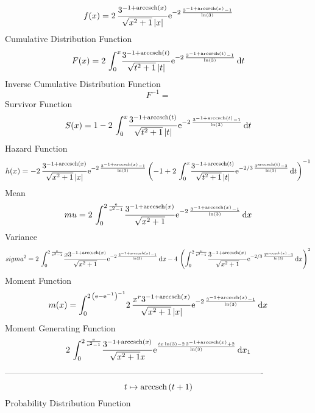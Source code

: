 \documentclass[12pt]{article}
\begin{document}
$$  f(x)=2\,{\frac {{3}^{-1+{\rm arccsch} \left(x\right)}}{\sqrt {{x}^{2}+1}
 \left| x \right| }{{\rm e}^{-2\,{\frac {{3}^{-1+{\rm arccsch} \left(x
\right)}-1}{\ln  \left( 3 \right) }}}}}
$$Cumulative Distribution Function  
 $$F(x)=2\,\int_{0}^{x}\!{\frac {{3}^{-1+{\rm arccsch} \left(t\right)}}{\sqrt 
{{t}^{2}+1} \left| t \right| }{{\rm e}^{-2\,{\frac {{3}^{-1+
{\rm arccsch} \left(t\right)}-1}{\ln  \left( 3 \right) }}}}}\,{\rm d}t
$$ Inverse Cumulative Distribution Function 
  $$F^{-1} = $$Survivor Function 
 $$ S(x)=1-2\,\int_{0}^{x}\!{\frac {{3}^{-1+{\rm arccsch} \left(t\right)}}{
\sqrt {{t}^{2}+1} \left| t \right| }{{\rm e}^{-2\,{\frac {{3}^{-1+
{\rm arccsch} \left(t\right)}-1}{\ln  \left( 3 \right) }}}}}\,{\rm d}t
$$ Hazard Function 
 $$ h(x)=-2\,{\frac {{3}^{-1+{\rm arccsch} \left(x\right)}}{\sqrt {{x}^{2}+1}
 \left| x \right| }{{\rm e}^{-2\,{\frac {{3}^{-1+{\rm arccsch} \left(x
\right)}-1}{\ln  \left( 3 \right) }}}} \left( -1+2\,\int_{0}^{x}\!{
\frac {{3}^{-1+{\rm arccsch} \left(t\right)}}{\sqrt {{t}^{2}+1}
 \left| t \right| }{{\rm e}^{-2/3\,{\frac {{3}^{{\rm arccsch} \left(t
\right)}-3}{\ln  \left( 3 \right) }}}}}\,{\rm d}t \right) ^{-1}}
$$Mean 
 $$ mu=2\,\int_{0}^{2\,{\frac {{\rm e}}{{{\rm e}^{2}}-1}}}\!{\frac {{3}^{-1+
{\rm arccsch} \left(x\right)}}{\sqrt {{x}^{2}+1}}{{\rm e}^{-2\,{\frac 
{{3}^{-1+{\rm arccsch} \left(x\right)}-1}{\ln  \left( 3 \right) }}}}}
\,{\rm d}x
$$ Variance 
 $$ sigma^2 = 2\,\int_{0}^{2\,{\frac {{\rm e}}{{{\rm e}^{2}}-1}}}\!{\frac {x{3}^{-1+
{\rm arccsch} \left(x\right)}}{\sqrt {{x}^{2}+1}}{{\rm e}^{-2\,{\frac 
{{3}^{-1+{\rm arccsch} \left(x\right)}-1}{\ln  \left( 3 \right) }}}}}
\,{\rm d}x-4\, \left( \int_{0}^{2\,{\frac {{\rm e}}{{{\rm e}^{2}}-1}}}
\!{\frac {{3}^{-1+{\rm arccsch} \left(x\right)}}{\sqrt {{x}^{2}+1}}{
{\rm e}^{-2/3\,{\frac {{3}^{{\rm arccsch} \left(x\right)}-3}{\ln 
 \left( 3 \right) }}}}}\,{\rm d}x \right) ^{2}
$$Moment Function 
 $$ m(x) = \int_{0}^{2\, \left( {\rm e}-{{\rm e}^{-1}} \right) ^{-1}}\!2\,{\frac 
{{x}^{r}{3}^{-1+{\rm arccsch} \left(x\right)}}{\sqrt {{x}^{2}+1}
 \left| x \right| }{{\rm e}^{-2\,{\frac {{3}^{-1+{\rm arccsch} \left(x
\right)}-1}{\ln  \left( 3 \right) }}}}}\,{\rm d}x
$$ Moment Generating Function 
 $$2\,\int_{0}^{2\,{\frac {{\rm e}}{{{\rm e}^{2}}-1}}}\!{\frac {{3}^{-1+
{\rm arccsch} \left(x\right)}}{\sqrt {{x}^{2}+1}x}{{\rm e}^{{\frac {tx
\ln  \left( 3 \right) -2\,{3}^{-1+{\rm arccsch} \left(x\right)}+2}{
\ln  \left( 3 \right) }}}}}\,{\rm d}x_{{1}}
$$-------------------------------------------------------------------------------------------  \\$$t\mapsto {\rm arccsch} \left(t+1\right)
$$Probability Distribution Function 
\end{document}
